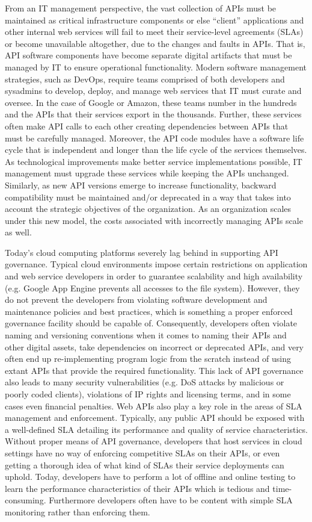 \documentclass[10pt]{article}
\begin{document}
From an IT management perspective, the vast collection of APIs must be
maintained as critical infrastructure components or else ``client'' applications
and other internal web services will fail to meet their service-level agreements (SLAs)
or become unavailable altogether, due to the changes and faults in APIs.  
That is, API software components have become separate digital artifacts that 
must be managed by IT to ensure operational functionality.
Modern software management strategies, such as DevOps,
require teams comprised of both developers and sysadmins to develop, 
deploy, and manage web services
that IT must curate and oversee.  In the case of Google or Amazon, these
teams number in the hundreds and the APIs that their services export in the
thousands.  Further, these services often make API calls to each other 
creating dependencies between APIs that must be carefully managed.
Moreover, the API code modules have a software life cycle that is
independent and longer than the life cycle of the services themselves. 
As technological improvements make better service implementations possible, IT
management must upgrade these services while keeping the APIs unchanged.
Similarly, as new API versions emerge to increase functionality, backward
compatibility must be maintained and/or deprecated in a way that takes into
account the strategic objectives of the organization.  As an organization
scales under this new model, the costs associated with
incorrectly managing APIs scale as well.

Today's cloud computing platforms severely lag behind in supporting
API governance. Typical cloud environments impose certain restrictions
on application and web service developers in order to guarantee scalability
and high availability (e.g. Google App Engine prevents all accesses to the file system). 
However, they do not prevent the developers from violating
software development and maintenance policies and best practices,
which is something a proper enforced governance facility should be capable of. 
Consequently, developers often violate naming and versioning conventions
when it comes to naming their APIs and other digital assets, take dependencies
on incorrect or deprecated APIs, and very often end up re-implementing program logic
from the scratch instead of using extant APIs that provide the required functionality.
This lack of API governance also leads to many security vulnerabilities (e.g. DoS attacks
by malicious or poorly coded clients), violations of IP rights and licensing terms, and in
some cases even financial penalties. Web APIs also play a key role in the areas of SLA
management and enforcement. Typically, any public API should be exposed with a well-defined
SLA detailing its performance and quality of service characteristics. Without proper means
of API governance, developers that host services in cloud settings have no way of enforcing
competitive SLAs on their APIs, or even getting a thorough idea of what kind of SLAs
their service deployments can uphold. Today, developers have to perform a lot of offline
and online testing to learn the performance characteristics of their APIs which is tedious and
time-consuming. Furthermore developers often have to be content with simple SLA monitoring 
rather than enforcing them.
\end{document}
